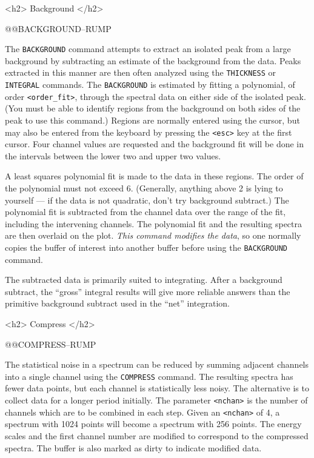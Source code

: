 {{{{{<h2> Background </h2>


@@{BACKGROUND--RUMP}

The {\tt BACKGROUND} command attempts to extract an isolated peak from a large
background by subtracting an estimate of the background from the data.  Peaks
extracted in this manner are then often analyzed using the {\tt THICKNESS} or
{\tt INTEGRAL} commands.  The {\tt BACKGROUND} is estimated by fitting a
polynomial, of order {\tt <order\_fit>}, through the spectral data on either
side of the isolated peak.  (You must be able to identify regions from the
background on both sides of the peak to use this command.)  Regions are
normally entered using the cursor, but may also be entered from the keyboard
by pressing the {\tt <esc>} key at the first cursor.  Four channel values are
requested and the background fit will be done in the intervals between the
lower two and upper two values.

A least squares polynomial fit is made to the data in these regions.  The
order of the polynomial must not exceed 6.  (Generally, anything above 2 is
lying to yourself --- if the data is not quadratic, don't try background
subtract.)   The polynomial fit is subtracted from the channel data over the
range of the fit, including the intervening channels.   The polynomial fit
and the resulting spectra are then overlaid on the plot.  {\it This command
modifies the data}, so one normally copies the buffer of interest into another
buffer before using the {\tt BACKGROUND} command.

The subtracted data is primarily suited to integrating.  After a background
subtract, the ``gross'' integral results will give more reliable answers than
the primitive background subtract used in the ``net'' integration.

\newpage

<h2> Compress </h2>


@@{COMPRESS--RUMP}

The statistical noise in a spectrum can be reduced by summing adjacent
channels into a single channel using the {\tt COMPRESS} command.  The
resulting spectra has fewer data points, but each channel is statistically
less noisy.  The alternative is to collect data for a longer period initially.
The parameter {\tt <nchan>} is the number of channels which are to be combined
in each step.  Given an {\tt <nchan>} of 4, a spectrum with 1024 points will
become a spectrum with 256 points.  The energy scales and the first channel
number are modified to correspond to the compressed spectra.  The buffer is
also marked as dirty to indicate modified data.

}}}}}
